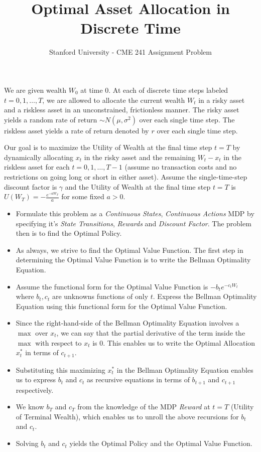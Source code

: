 \documentclass[12pt]{amsart}
\title{Optimal Asset Allocation in Discrete Time}
\author{Stanford University - CME 241 Assignment Problem}
\date{} %
\begin{document}
\maketitle

We are given wealth $W_0$ at time 0. At each of discrete time steps labeled $t = 0, 1, \ldots, T$, we are allowed to allocate the current wealth $W_t$ in a risky asset and a riskless asset in an unconstrained, frictionless manner. The risky asset yields a random rate of return $\sim N(\mu, \sigma^2)$ over each single time step. The riskless asset yields a rate of return denoted by $r$ over each single time step.

Our goal is to maximize the Utility of Wealth at the final time step $t=T$ by dynamically allocating $x_t$ in the risky asset and the remaining $W_t - x_t$ in the riskless asset for each $t = 0, 1, \ldots, T-1$ (assume no transaction costs and no restrictions on going long or short in either asset). Assume the single-time-step discount factor is $\gamma$ and the Utility of Wealth at the final time step $t=T$ is $U(W_T) = - \frac {e^{-a W_T}} {a}$ for some fixed $a > 0$.

\begin{itemize}
\item Formulate this problem as a {\em Continuous States}, {\em Continuous Actions} MDP by specifying it's {\em State Transitions}, {\em Rewards} and {\em Discount Factor}. The problem then is to find the Optimal Policy.
\item As always, we strive to find the Optimal Value Function. The first step in determining the Optimal Value Function is to write the Bellman Optimality Equation.
\item Assume the functional form for the Optimal Value Function is $-b_t e^{-c_t W_t}$ where $b_t, c_t$ are unknowns functions of only $t$. Express the Bellman Optimality Equation using this functional form for the Optimal Value Function.
\item Since the right-hand-side of the Bellman Optimality Equation involves a $\max$ over $x_t$, we can say that the partial derivative of the term inside the $\max$ with respect to $x_t$ is 0. This enables us to write the Optimal Allocation $x_t^*$ in terms of $c_{t+1}$.
\item Substituting this maximizing $x_t^*$ in the Bellman Optimality Equation enables us to express $b_t$ and $c_t$ as recursive equations in terms of $b_{t+1}$ and $c_{t+1}$ respectively.
\item We know $b_T$ and $c_T$ from the knowledge of the MDP {\em Reward} at $t=T$ (Utility of Terminal Wealth), which enables us to unroll the above recursions for $b_t$ and $c_t$.
\item Solving $b_t$ and $c_t$ yields the Optimal Policy and the Optimal Value Function.
\end{itemize}
\end{document}
